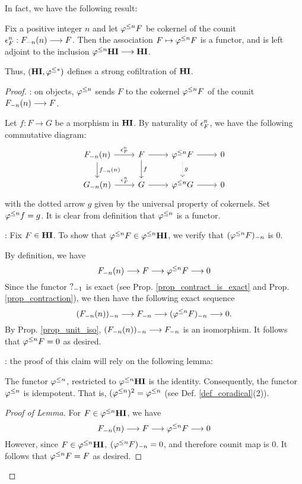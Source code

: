 In fact, we have the following result:

\begin{prop}\label{prop_HI_lower_slice}
Fix a positive integer $n$ and let $\tlHI{n}F$ be cokernel of the 
counit $\cuHI^n_F: \LHI[n]{\RHI[n]{F}} \to F$. Then the 
association $F \mapsto \tlHI{n}F$ is a functor, and is left 
adjoint to the inclusion $\tlHI{n}\HI \to \HI$.

Thus, $(\HI, \tlHI{*})$ defines a strong cofiltration
of $\HI$.
\end{prop}
\begin{proof}
 : on objects, $\tlHI{n}$ sends $F$ to the 
cokernel $\tlHI{n}F$ of the counit $\LHI[n]{\RHI[n]{F}} \to F$.

Let $f: F \to G$ be a morphism in $\HI$.
By naturality of $\cuHI^n_F$, we have the following commutative
diagram:
\[
\begin{tikzcd}
\LHI[n]{\RHI[n]{F}} \arrow{r}{\cuHI_F^n} \arrow{d}{\LHI[n]{\RHI[n]{f}}}
& F \arrow{r} \arrow{d}{f}
& \tlHI{n} F \arrow[dotted]{d}{g} \arrow{r}
& 0 \\
\LHI[n]{\RHI[n]{G}} \arrow{r}{\cuHI_F^n}
& G \arrow{r}
& \tlHI{n}G \arrow{r}
& 0
\end{tikzcd}
\]
with the dotted arrow $g$ given by the universal property of 
cokernels. Set $\tlHI{n}f = g$. It is clear from definition that
$\tlHI{n}$ is a functor.

 : Fix $F \in \HI$. To
show that $\tlHI{n}F \in \tlHI{n}\HI$, we verify that 
$\RHI[n]{(\tlHI{n}F)}$ is 0.

By definition, we have
\[
\LHI[n]{\RHI[n]{F}} \to F \to \tlHI{n}F \to 0
\]
Since the functor $\RHI{?}$ is exact (see Prop. 
\ref{prop_contract_is_exact} and Prop. \ref{prop_contraction}), 
we then have the following exact sequence
\[
\RHI[n]{(\LHI[n]{\RHI[n]{F}})} \to \RHI[n]{F} \to
\RHI[n]{(\tlHI{n}F)} \to 0.
\]
By Prop. \ref{prop_unit_iso}, $\RHI[n]{(\LHI[n]{\RHI[n]{F}})}
\to \RHI[n]{F}$ is an isomorphism. It follows that $\tlHI{n}F = 
0$ as desired.

 : the proof
of this claim will rely on the following lemma:

\begin{lem}\label{lem_tlHI_id}
The functor $\tlHI{n}$, restricted to $\tlHI{n}\HI$ is the 
identity. Consequently, the functor $\tlHI{n}$ is idempotent. 
That is, $(\tlHI{n})^2 = \tlHI{n}$ (see Def. 
\ref{def_coradical}(2)).
\end{lem}
\begin{proof}[Proof of Lemma]
For $F \in \tlHI{n}\HI$, we have
\[
\LHI[n]{\RHI[n]{F}} \to F \to \tlHI{n}F \to 0
\]
However, since $F \in \tlHI{n}\HI$, $\RHI[n]{(\tlHI{n}F)} = 0$, and 
therefore counit map is $0$. It follows that $\tlHI{n}F = F$ as 
desired.


\end{proof}
\end{proof}
